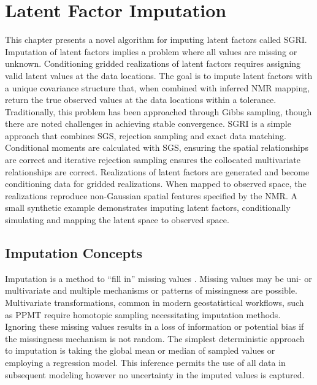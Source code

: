 
\chapter{Latent Factor Imputation}
\label{ch:impute}

This chapter presents a novel algorithm for imputing latent factors called \gls{SGRI}. Imputation of latent factors implies a problem where all values are missing or unknown. Conditioning gridded realizations of latent factors requires assigning valid latent values at the data locations. The goal is to impute latent factors with a unique covariance structure that, when combined with inferred \gls{NMR} mapping, return the true observed values at the data locations within a tolerance. Traditionally, this problem has been approached through Gibbs sampling, though there are noted challenges in achieving stable convergence. \gls{SGRI} is a simple approach that combines \gls{SGS}, rejection sampling and exact data matching. Conditional moments are calculated with \gls{SGS}, ensuring the spatial relationships are correct and iterative rejection sampling ensures the collocated multivariate relationships are correct. Realizations of latent factors are generated and become conditioning data for gridded realizations. When mapped to observed space, the realizations reproduce non-Gaussian spatial features specified by the \gls{NMR}. A small synthetic example demonstrates imputing latent factors, conditionally simulating and mapping the latent space to observed space.

\section{Imputation Concepts}
\label{sec:impute}

Imputation is a method to ``fill in'' missing values \citep{little2019statistical}. Missing values may be uni- or multivariate and multiple mechanisms or patterns of missingness are possible. Multivariate transformations, common in modern geostatistical workflows, such as \gls{PPMT} \citep{barnett2014projection} require homotopic sampling necessitating imputation methods. Ignoring these missing values results in a loss of information or potential bias if the missingness mechanism is not random. The simplest deterministic approach to imputation is taking the global mean or median of sampled values or employing a regression model. This inference permits the use of all data in subsequent modeling however no uncertainty in the imputed values is captured.

